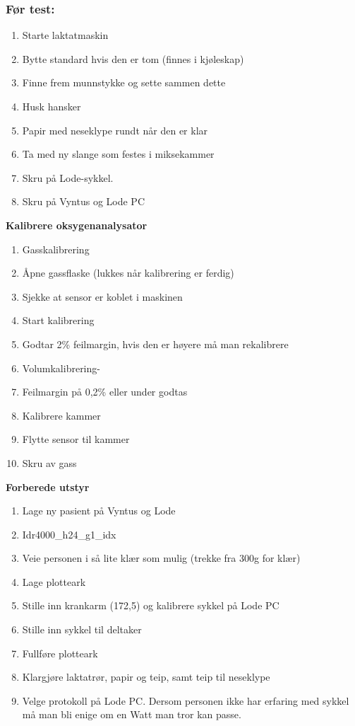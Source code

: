 \documentclass[
  letterpaper,
  DIV=11,
  numbers=noendperiod]{scrreprt}
\providecommand{\tightlist}{%
  \setlength{\itemsep}{0pt}\setlength{\parskip}{0pt}}\usepackage{longtable,booktabs,array}
\begin{document}
\subsubsection{Før test:}\label{fuxf8r-test}

\begin{enumerate}
\def\labelenumi{\arabic{enumi}.}
\tightlist
\item
  Starte laktatmaskin
\item
  Bytte standard hvis den er tom (finnes i kjøleskap)
\item
  Finne frem munnstykke og sette sammen dette
\item
  Husk hansker
\item
  Papir med neseklype rundt når den er klar
\item
  Ta med ny slange som festes i miksekammer
\item
  Skru på Lode-sykkel.
\item
  Skru på Vyntus og Lode PC
\end{enumerate}

\textbf{Kalibrere oksygenanalysator}

\begin{enumerate}
\def\labelenumi{\arabic{enumi}.}
\tightlist
\item
  Gasskalibrering
\item
  Åpne gassflaske (lukkes når kalibrering er ferdig)
\item
  Sjekke at sensor er koblet i maskinen
\item
  Start kalibrering
\item
  Godtar 2\% feilmargin, hvis den er høyere må man rekalibrere
\item
  Volumkalibrering-
\item
  Feilmargin på 0,2\% eller under godtas
\item
  Kalibrere kammer
\item
  Flytte sensor til kammer
\item
  Skru av gass
\end{enumerate}

\textbf{Forberede utstyr}

\begin{enumerate}
\def\labelenumi{\arabic{enumi}.}
\item
  Lage ny pasient på Vyntus og Lode
\item
  Idr4000\_h24\_g1\_idx
\item
  Veie personen i så lite klær som mulig (trekke fra 300g for klær)
\item
  Lage plotteark
\item
  Stille inn krankarm (172,5) og kalibrere sykkel på Lode PC
\item
  Stille inn sykkel til deltaker
\item
  Fullføre plotteark
\item
  Klargjøre laktatrør, papir og teip, samt teip til neseklype
\item
  Velge protokoll på Lode PC. Dersom personen ikke har erfaring med
  sykkel må man bli enige om en Watt man tror kan passe.
\end{enumerate}
\end{document}
